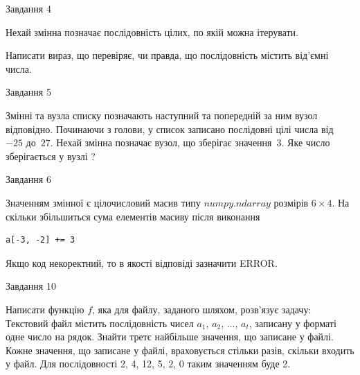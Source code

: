 \documentclass[12pt, ukrainian]{article}
\begin{document}
{\begin{minipage}[t]{8.0cm}
\end{minipage}

               
{\begin{center}Завдання {4}\end{center}}
\vspace{-6mm}
Нехай змінна  позначає послідовність цілих, по якій можна ітерувати.

Написати вираз, що перевіряє, чи правда, що послідовність  містить від’ємні числа.\par

\vspace{10mm}
               
{\begin{center}Завдання {5}\end{center}}
\vspace{-6mm}
Змінні  та  вузла списку позначають наступний та попередній за ним вузол відповідно. Починаючи з голови, у список записано послідовні цілі числа від~$-25$ до~$27$. Нехай змінна  позначає вузол, що зберігає значення~$3$.
Яке число зберігається у вузлі  ?\par

               
{\begin{center}Завдання {6}\end{center}}
\vspace{-6mm}
Значенням змінної  є цілочисловий масив типу $numpy.ndarray$ розмірів $6{\times}4$. На скільки збільшиться сума елементів масиву  після виконання
\begin{verbatim}
a[-3, -2] += 3
\end{verbatim}


Якщо код некоректний, то в якості відповіді зазначити ERROR.\par

               
{\begin{center}Завдання {10}\end{center}}
\vspace{-6mm}

Написати функцію $f$, яка для файлу, заданого шляхом, розв’язує задачу:\\ Текстовий файл містить послідовність чисел $a_1$, $a_2$, $\ldots$, $a_t$, записану у форматі одне число на рядок. Знайти третє найбільше значення, що записане у файлі. Кожне значення, що записане у файлі, враховується стільки разів, скільки входить у файл. Для послідовності 2, 4, 12, 5, 2, 0 таким значенням буде 2.

}
\end{document}

